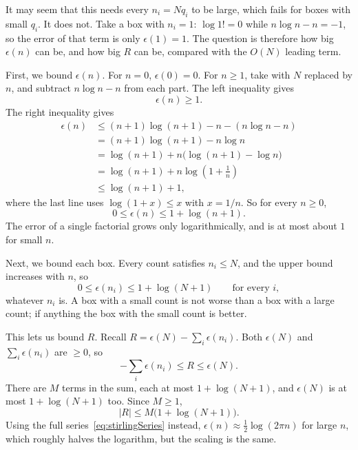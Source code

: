 It may seem that this needs every $n_i=Nq_i$ to be large, which fails for
boxes with small $q_i$. It does not. Take a box with $n_i=1$: $\log1!=0$ while
$n\log n-n=-1$, so 
the error of that term is only $\epsilon(1)=1$.
The question is therefore how big $\epsilon(n)$ can
be, and how big $R$ can be, compared with the $O(N)$ leading term.

First, we bound $\epsilon(n)$. For $n=0$, $\epsilon(0)=0$. For $n\ge1$,
take  with $N$ replaced by $n$, and subtract
$n\log n-n$ from each part. The left inequality gives
\begin{equation}
  \epsilon(n) \ge 1 .
\end{equation}
The right inequality gives
\begin{align}
  \epsilon(n) &\le (n+1)\log(n+1) - n - (n\log n - n) \\
  &= (n+1)\log(n+1) - n\log n \nonumber\\
  &= \log(n+1) + n\bigl(\log(n+1)-\log n\bigr) \nonumber\\
  &= \log(n+1) + n\log\left(1+\tfrac1n\right) \nonumber\\
  &\le \log(n+1) + 1 , \nonumber
\end{align}
where the last line uses $\log(1+x)\le x$ with $x=1/n$. So for every $n\ge0$,
\begin{equation}
  0 \le \epsilon(n) \le 1 + \log(n+1) .
\end{equation}
The error of a single factorial grows only logarithmically, and is at most
about $1$ for small $n$.

Next, we bound each box. Every count satisfies $n_i\le N$, and the
upper bound increases with $n$, so
\begin{equation}
  0 \le \epsilon(n_i) \le 1 + \log(N+1)
  \qquad\text{for every } i,
\end{equation}
whatever $n_i$ is. A box with a small count is not worse than a box with a
large count; if anything the box with the small count is better.

This lets us bound $R$. Recall $R=\epsilon(N)-\sum_i\epsilon(n_i)$. Both
$\epsilon(N)$ and $\sum_i\epsilon(n_i)$ are $\ge0$, so 
\begin{equation}
  -\sum_i\epsilon(n_i) \le R \le \epsilon(N) .
\end{equation}
There are $M$ terms in the sum, each at most $1+\log(N+1)$, and $\epsilon(N)$
is at most $1+\log(N+1)$ too. Since $M\ge1$,
\begin{equation}
  |R| \le M\bigl(1+\log(N+1)\bigr) .
\end{equation}
Using the full series~\eqref{eq:stirlingSeries} instead, $\epsilon(n)\approx
\frac12\log(2\pi n)$ for large $n$, which roughly halves the logarithm, but the
scaling is the same.

